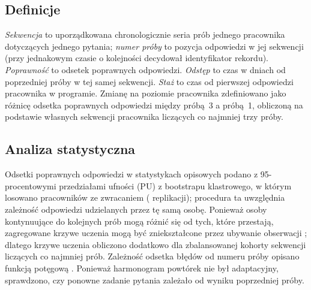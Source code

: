 
\subsection{Definicje}
\emph{Sekwencja} to uporządkowana chronologicznie seria prób jednego pracownika dotyczących jednego
pytania; \emph{numer próby} to pozycja odpowiedzi w jej sekwencji (przy jednakowym czasie o kolejności
decydował identyfikator rekordu). \emph{Poprawność} to odsetek poprawnych odpowiedzi. \emph{Odstęp}
to czas w dniach od poprzedniej próby w tej samej sekwencji. \emph{Staż} to czas od pierwszej
odpowiedzi pracownika w programie. Zmianę na poziomie pracownika zdefiniowano jako różnicę odsetka
poprawnych odpowiedzi między próbą~3 a próbą~1, obliczoną na podstawie własnych sekwencji pracownika
liczących co najmniej trzy próby.

\subsection{Analiza statystyczna}
Odsetki poprawnych odpowiedzi w statystykach opisowych podano z 95-procentowymi przedziałami ufności (PU) z bootstrapu
klastrowego, w którym losowano pracowników ze zwracaniem (\BootReps{} replikacji); procedura ta
uwzględnia zależność odpowiedzi udzielanych przez tę samą osobę. Ponieważ osoby kontynuujące do kolejnych prób mogą różnić się od
tych, które przestają, zagregowane krzywe uczenia mogą być zniekształcone przez ubywanie obserwacji
\citep{murray2013,goutte2018}; dlatego krzywe uczenia obliczono dodatkowo dla zbalansowanej kohorty
sekwencji liczących co najmniej \CohortK{} prób. Zależność odsetka błędów od numeru próby opisano
funkcją potęgową \citep{newell1981}. Ponieważ harmonogram powtórek nie był adaptacyjny, sprawdzono,
czy ponowne zadanie pytania zależało od wyniku poprzedniej próby.

